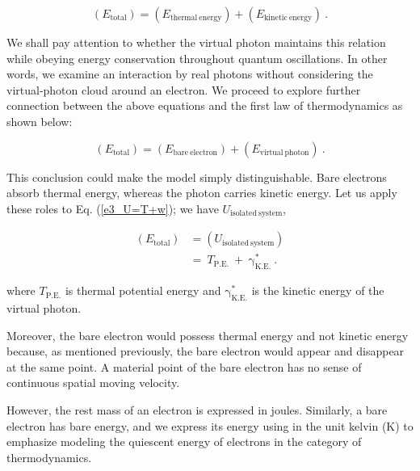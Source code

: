 \documentclass[%
 reprint,
 amsmath,amssymb,
 aps,
]{revtex4-1}
\numberwithin{equation}{section}%
\begin{document}
        \begin{equation}
            \left( E_{\mathrm{total}} \right) = \left( E_{\mathrm{thermal \ energy}} \right) + \left( E_{\mathrm{kinetic \ energy}} \right)
            \ .
            \label{e3_E_total^2_05}
        \end{equation}

    We shall pay attention to whether the virtual photon maintains this relation while obeying energy conservation throughout quantum oscillations. In other words, we examine an interaction by real photons without considering the virtual-photon cloud around an electron. We proceed to explore further connection between the above equations and the first law of thermodynamics as shown below:

        \begin{equation}
            \left( E_{\mathrm{total}} \right) = \left( E_{\mathrm{bare \ electron}} \right) + \left( E_{\mathrm{virtual \ photon}} \right)
            \ .
            \label{e3_E_total^2_06}
        \end{equation}


    This conclusion could make the model simply distinguishable. Bare electrons absorb thermal energy, whereas the photon carries kinetic energy. Let us apply these roles to Eq. (\ref{e3_U=T+w});  we have $U_{\mathrm{isolated \ system}}$,

        \begin{equation}
            \begin{split}
                \left( E_{\mathrm{total}} \right)
                    &= \left( U_{\mathrm{isolated \ system}} \right) \\
                    &= \ {T_{\mathrm{P.E.}}} \ + \ \mathrm{\gamma}^{*}_\mathrm{K.E.}
                    \ .
            \end{split}
        \end{equation}

    \noindent
    where ${T_{\mathrm{P.E.}}}$ is thermal potential energy and $\mathrm{\gamma}^{*}_\mathrm{K.E.}$ is the kinetic energy of the virtual photon.

    Moreover, the bare electron would possess thermal energy and not kinetic energy because, as mentioned previously, the bare electron would appear and disappear at the same point. A material point of the bare electron has no sense of continuous spatial moving velocity.

    However, the rest mass of an electron is expressed in joules. Similarly, a bare electron has bare energy, and we express its energy using in the unit kelvin (K) to emphasize modeling the quiescent energy of electrons in the category of thermodynamics.
\end{document}

